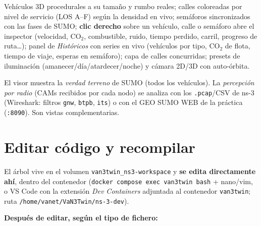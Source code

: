 \documentclass[11pt,a4paper]{article}
\begin{document}
Vehículos 3D procedurales a su tamaño y rumbo reales; calles coloreadas por
nivel de servicio (LOS A--F) según la densidad en vivo; semáforos
sincronizados con las fases de SUMO; \textbf{clic derecho} sobre un
vehículo, calle o semáforo abre el inspector (velocidad, CO$_2$, combustible,
ruido, tiempo perdido, carril, progreso de ruta\ldots); panel de
\emph{Históricos} con series en vivo (vehículos por tipo, CO$_2$ de flota,
tiempo de viaje, esperas en semáforo); capa de calles concurridas; presets de
iluminación (amanecer/día/atardecer/noche) y cámara 2D/3D con auto-órbita.

\begin{notabox}
El visor muestra la \emph{verdad terreno} de SUMO (todos los vehículos). La
\emph{percepción por radio} (CAMs recibidos por cada nodo) se analiza con los
\texttt{.pcap}/CSV de ns-3 (Wireshark: filtros \texttt{gnw}, \texttt{btpb},
\texttt{its}) o con el GEO SUMO WEB de la práctica (\texttt{:8090}).
Son vistas complementarias.
\end{notabox}

\section{Editar código y recompilar}
\label{sec:editar}

El árbol vive en el volumen \texttt{van3twin\_ns3-workspace} y \textbf{se
edita directamente ahí}, dentro del contenedor
(\texttt{docker compose exec van3twin bash} + nano/vim, o VS Code con la
extensión \emph{Dev Containers} adjuntada al contenedor \texttt{van3twin};
ruta \texttt{/home/vanet/VaN3Twin/ns-3-dev}).

\textbf{Después de editar, según el tipo de fichero:}
\end{document}
